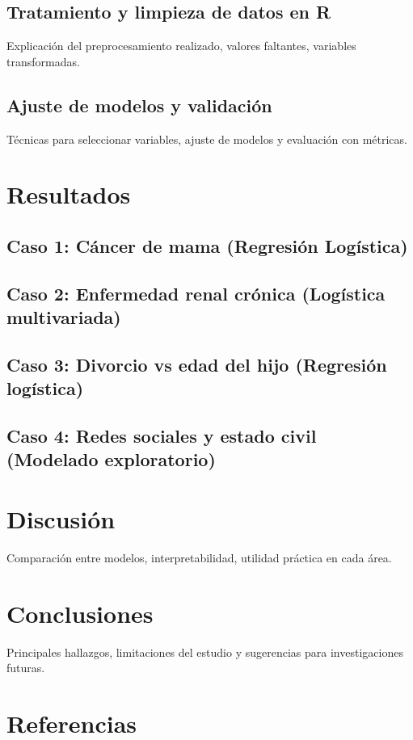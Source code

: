 \documentclass[12pt]{article}
\begin{document}
\subsection{Tratamiento y limpieza de datos en R}
Explicación del preprocesamiento realizado, valores faltantes, variables transformadas.

\subsection{Ajuste de modelos y validación}
Técnicas para seleccionar variables, ajuste de modelos y evaluación con métricas.

\section{Resultados}
\subsection{Caso 1: Cáncer de mama (Regresión Logística)}
\subsection{Caso 2: Enfermedad renal crónica (Logística multivariada)}
\subsection{Caso 3: Divorcio vs edad del hijo (Regresión logística)}
\subsection{Caso 4: Redes sociales y estado civil (Modelado exploratorio)}

\section{Discusión}
Comparación entre modelos, interpretabilidad, utilidad práctica en cada área.

\section{Conclusiones}
Principales hallazgos, limitaciones del estudio y sugerencias para investigaciones futuras.

\section*{Referencias}


\end{document}
